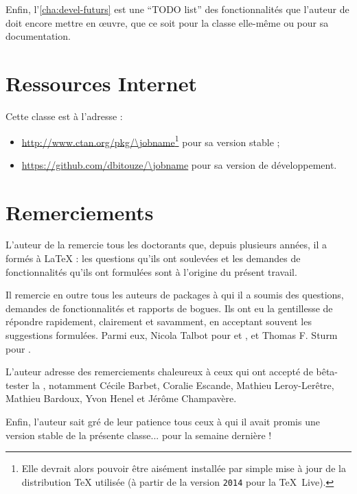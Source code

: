 Enfin, l'\vref{cha:devel-futurs} est une \foreignquote{english}{TODO list} des
fonctionnalités que l'auteur de \yat{} doit encore mettre en œuvre, que ce soit
pour la classe elle-même ou pour sa documentation.

\section{Ressources Internet}
\label{sec:ressources-internet}

Cette classe est  à l'adresse :
\begin{itemize}
\item \url{http://www.ctan.org/pkg/\jobname}\footnote{Elle devrait alors
    pouvoir être aisément installée par simple mise à jour de la distribution
    \TeX{} utilisée (à partir de la version \texttt{2014} pour la \TeX~Live).}
  pour sa version stable ;
\item \url{https://github.com/dbitouze/\jobname} pour sa version de
  développement.
\end{itemize}

\section{Remerciements}
\label{sec:remerciements}

L'auteur de la \yatcl{} remercie tous les doctorants que, depuis plusieurs
années, il a formés à \LaTeX{} : les questions qu'ils ont soulevées et les
demandes de fonctionnalités qu'ils ont formulées sont à l'origine du présent
travail.

Il remercie en outre tous les auteurs de packages à qui il a soumis  des questions, demandes de fonctionnalités et
rapports de bogues. Ils ont eu la gentillesse de répondre rapidement,
clairement et savamment, en acceptant souvent les suggestions formulées. Parmi
eux, Nicola Talbot pour  et , et Thomas
F. Sturm pour .

L'auteur adresse des remerciements chaleureux à ceux qui ont accepté de
bêta-tester la \yatcl{}, notamment Cécile Barbet, Coralie Escande, Mathieu
Leroy-Lerêtre, Mathieu Bardoux, Yvon Henel et Jérôme Champavère.

Enfin, l'auteur sait gré de leur patience tous ceux à qui il avait promis une
version stable de la présente classe... pour la semaine dernière !

%
\iffalse
\fi
